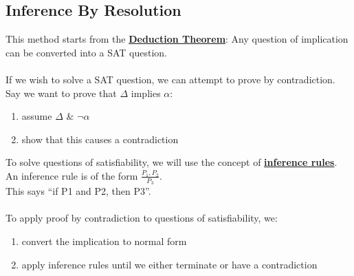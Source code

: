 \documentclass[../../lecture_notes.tex]{subfiles}
\begin{document}
\subsection*{Inference By Resolution}
\noindent This method starts from the \textbf{\underline{Deduction Theorem}}:
\indent Any question of implication can be converted into a SAT question.\\
\\
If we wish to solve a SAT question, we can attempt to prove by contradiction.
\indent Say we want to prove that $\Delta$ implies $\alpha$:
\begin{enumerate} [itemsep=0mm]
	\item assume $\Delta$ \& $\neg \alpha$ 
	\item show that this causes a contradiction
\end{enumerate} \medskip

\noindent  To solve questions of satisfiability, we will use the concept of \textbf{\underline{inference rules}}.\\
An inference rule is of the form $\frac{P_1, P_2} {P_3}$.\\
\indent This says “if P1 and P2, then P3”.\\
\\
To apply proof by contradiction to questions of satisfiability, we:
\begin{enumerate} [itemsep=0mm]
	\item convert the implication to normal form
	\item apply inference rules until we either terminate or have a contradiction
\end{enumerate} \medskip
\end{document}
